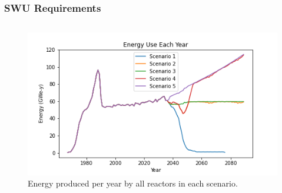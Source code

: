 \begin{frame}
    \frametitle{\gls{SWU} Requirements}
    \begin{columns}
        \column[t]{5cm}

        \column[t]{5cm}
        \begin{figure}
            \centering 
            \includegraphics[scale=0.3]{figures/energy_scenarios_all.png}
            \caption{Energy produced per year by all reactors in each scenario.}
            \label{fig:swu}
        \end{figure}
    \end{columns}
    

\end{frame}

